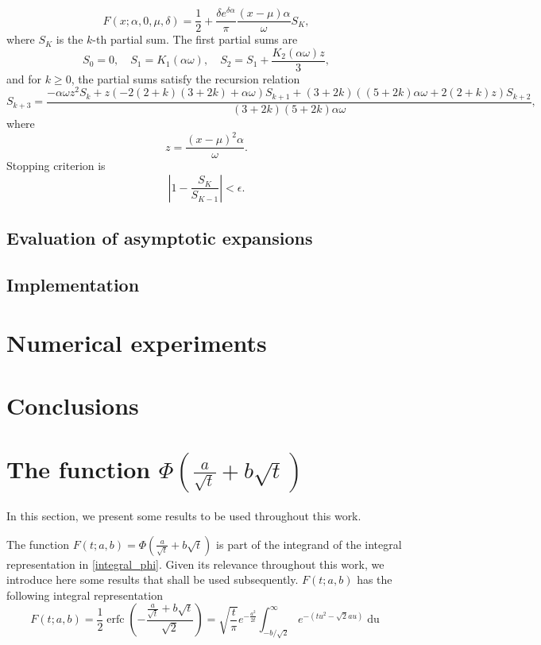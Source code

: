 \documentclass[10pt,a4paper,oneside]{article}
\DeclareMathOperator{\erfc}{erfc}
\numberwithin{equation}{section}
\begin{document}
\begin{equation}
F(x;\alpha, 0, \mu, \delta) = \frac{1}{2} + \frac{\delta e^{\delta \alpha}}{\pi}\frac{(x-\mu) \alpha}{\omega}S_K,
\end{equation}
where $S_K$ is the $k$-th partial sum. The first partial sums are
\begin{equation}
S_0 = 0, \quad S_1 = K_1(\alpha \omega), \quad S_2 = S_1 + \frac{K_2(\alpha \omega)z}{3},
\end{equation}
and for $k \ge 0$, the partial sums satisfy the recursion relation
\begin{equation}
S_{k+3} = \frac{-\alpha\omega z^2 S_k + z \left(-2 (2+k) (3 + 2k) + \alpha\omega\right) S_{k+1} + (3 + 2k) \left((5 + 2k) \alpha\omega + 2(2+k)z\right) S_{k+2}}{(3 + 2k) (5 + 2k) \alpha \omega},
\end{equation}
where
\begin{equation}
z = \frac{(x-\mu)^2 \alpha}{\omega}.
\end{equation}
Stopping criterion is
\begin{equation}
\left|1 - \frac{S_{K}}{S_{K-1}} \right| < \epsilon.
\end{equation}


\subsection{Evaluation of asymptotic expansions}

\subsection{Implementation}\label{subsection_implementation}


\section{Numerical experiments}

\section{Conclusions}

\appendix
\section{The function $\Phi\left(\frac{a}{\sqrt{t}} + b\sqrt{t}\right)$}
In this section, we present some results to be used throughout this work.

The function $F(t; a, b) = \Phi\left(\frac{a}{\sqrt{t}} + b\sqrt{t}\right)$ is part of the integrand of the integral representation in \eqref{integral_phi}. Given its relevance throughout this work, we introduce here some results that shall be used subsequently. $F(t; a, b)$ has the following integral representation \cite[\S 7.7.6]{NIST:DLMF}
\begin{equation}\label{integral_erfc_ab}
F(t; a, b) = \frac{1}{2}\erfc\left(-\frac{\frac{a}{\sqrt{t}} + b\sqrt{t}}{\sqrt{2}}\right)  = \sqrt{\frac{t}{\pi}} e^{-\frac{a^2}{2t}} \int_{-b/\sqrt{2}}^{\infty} e^{-(tu^2 - \sqrt{2}au)} \mathop{du}
\end{equation}
\end{document}
